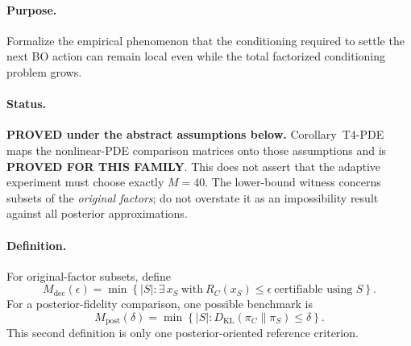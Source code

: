 \paragraph{Purpose.}
Formalize the empirical phenomenon that the conditioning required to settle the
next BO action can remain local even while the total factorized conditioning
problem grows.

\paragraph{Status.}
\textbf{PROVED under the abstract assumptions below.}  Corollary~T4-PDE maps
the nonlinear-PDE comparison matrices onto those assumptions and is
\textbf{PROVED FOR THIS FAMILY}.  This does not assert that the adaptive
experiment must choose exactly $M=40$.  The lower-bound witness concerns
subsets of the \emph{original factors}; do not overstate it as an impossibility
result against all posterior approximations.

\paragraph{Definition.}
For original-factor subsets, define
\begin{equation}
    M_{\mathrm{dec}}(\epsilon)
    =
    \min\left\{|S|:
    \exists\,x_S\ \text{with}\ R_C(x_S)\le\epsilon
    \ \text{certifiable using }S\right\}.
    \label{eq:Mdec}
\end{equation}
For a posterior-fidelity comparison, one possible benchmark is
\begin{equation}
    M_{\mathrm{post}}(\delta)
    =
    \min\left\{|S|:
    D_{\mathrm{KL}}(\pi_C\|\pi_S)\le\delta\right\}.
    \label{eq:Mpost}
\end{equation}
This second definition is only one posterior-oriented reference criterion.

